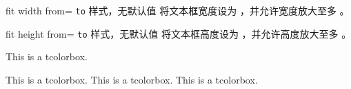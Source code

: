 \begin{docTcbKey}{fit width from}{= \texttt{to} }{样式，无默认值}
  将文本框宽度设为 ，并允许宽度放大至多 。
\begin{dispExample}

\begin{tcolorbox}[fit,width=\linewidth/2]
\lipsum[2]
\end{tcolorbox}\par
\begin{tcolorbox}[fit width from=\linewidth/2 to \linewidth]
\lipsum[2]
\end{tcolorbox}\par
\end{dispExample}
\end{docTcbKey}

\clearpage
\begin{docTcbKey}{fit height from}{= \texttt{to} }{样式，无默认值}
  将文本框高度设为 ，并允许高度放大至多 。
\begin{dispExample}

\begin{mybox}
This is a tcolorbox.
\end{mybox}
\begin{mybox}
This is a tcolorbox. This is a tcolorbox. This is a tcolorbox.
\end{mybox}
\begin{mybox}
\lipsum[2]
\end{mybox}
\end{dispExample}
\end{docTcbKey}

